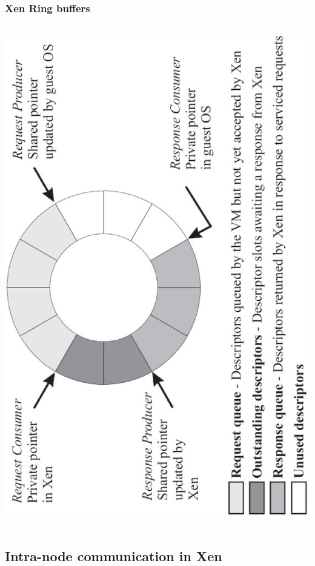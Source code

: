 \documentclass[red,slidestop,notes,compress,mathserif]{beamer}
\begin{document}
\begin{frame}
\frametitle{Xen Ring buffers}
\begin{columns}
\column{\textwidth}
\includegraphics[width=.6\textwidth,angle=-90]{figures/test.eps}
\end{columns}
\end{frame}



\subsection{Intra-node communication in Xen}
\end{document}

